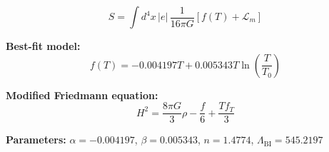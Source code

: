 
\begin{equation}
  S = \int d^4x \, |e| \, \frac{1}{16\pi G} \left[ f(T) + \mathcal{L}_m \right]
\end{equation}

\textbf{Best-fit model:}
\begin{equation}
  f(T) = -0.004197 T + 0.005343 T \ln\!\left(\frac{T}{T_0}\right)
\end{equation}

\textbf{Modified Friedmann equation:}
\begin{equation}
  H^2 = \frac{8\pi G}{3} \rho - \frac{f}{6} + \frac{T f_T}{3}
\end{equation}

\textbf{Parameters:}
$\alpha = -0.004197$, \quad
$\beta = 0.005343$, \quad
$n = 1.4774$, \quad
$\Lambda_{\text{BI}} = 545.2197$